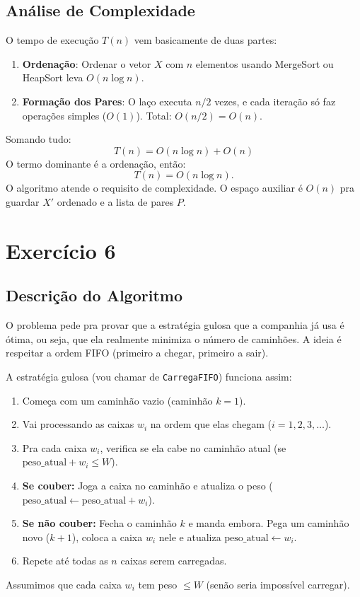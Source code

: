 \documentclass[a4paper,12pt]{article}
\begin{document}
\subsection*{Análise de Complexidade}
O tempo de execução $T(n)$ vem basicamente de duas partes:
\begin{enumerate}
    \item \textbf{Ordenação}: Ordenar o vetor $X$ com $n$ elementos usando MergeSort ou HeapSort leva $O(n \log n)$.
    \item \textbf{Formação dos Pares}: O laço executa $n/2$ vezes, e cada iteração só faz operações simples ($O(1)$). Total: $O(n/2) = O(n)$.
\end{enumerate}
Somando tudo:
$$ T(n) = O(n \log n) + O(n) $$
O termo dominante é a ordenação, então:
\begin{equation}
\boxed{T(n) = O(n \log n)}.
\end{equation}
O algoritmo atende o requisito de complexidade. O espaço auxiliar é $O(n)$ pra guardar $X'$ ordenado e a lista de pares $P$.

\newpage
\section*{Exercício 6}

\subsection*{Descrição do Algoritmo}
O problema pede pra provar que a estratégia gulosa que a companhia já usa é ótima, ou seja, que ela realmente minimiza o número de caminhões. A ideia é respeitar a ordem FIFO (primeiro a chegar, primeiro a sair).

A estratégia gulosa (vou chamar de \texttt{CarregaFIFO}) funciona assim:
\begin{enumerate}
    \item Começa com um caminhão vazio (caminhão $k=1$).
    \item Vai processando as caixas $w_i$ na ordem que elas chegam ($i=1, 2, 3, \dots$).
    \item Pra cada caixa $w_i$, verifica se ela cabe no caminhão atual (se $\text{peso\_atual} + w_i \le W$).
    \item \textbf{Se couber:} Joga a caixa no caminhão e atualiza o peso ($\text{peso\_atual} \leftarrow \text{peso\_atual} + w_i$).
    \item \textbf{Se não couber:} Fecha o caminhão $k$ e manda embora. Pega um caminhão novo ($k+1$), coloca a caixa $w_i$ nele e atualiza $\text{peso\_atual} \leftarrow w_i$.
    \item Repete até todas as $n$ caixas serem carregadas.
\end{enumerate}
Assumimos que cada caixa $w_i$ tem peso $\le W$ (senão seria impossível carregar).
\end{document}

